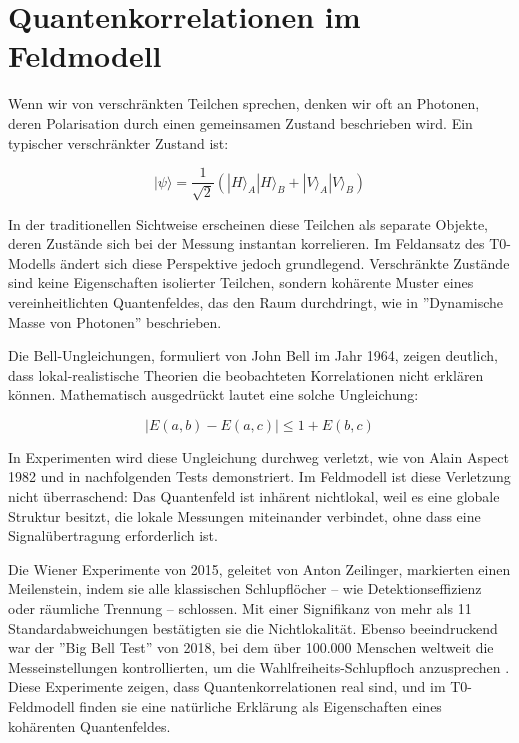\documentclass[a4paper,12pt]{article}
\theoremstyle{definition}
\theoremstyle{remark}
\begin{document}
	\section{Quantenkorrelationen im Feldmodell}
	
	Wenn wir von verschränkten Teilchen sprechen, denken wir oft an Photonen, deren Polarisation durch einen gemeinsamen Zustand beschrieben wird. Ein typischer verschränkter Zustand ist:
	
	\begin{equation}
		|\psi\rangle = \frac{1}{\sqrt{2}} (|H\rangle_A |H\rangle_B + |V\rangle_A |V\rangle_B)
	\end{equation}
	
	In der traditionellen Sichtweise erscheinen diese Teilchen als separate Objekte, deren Zustände sich bei der Messung instantan korrelieren. Im Feldansatz des T0-Modells ändert sich diese Perspektive jedoch grundlegend. Verschränkte Zustände sind keine Eigenschaften isolierter Teilchen, sondern kohärente Muster eines vereinheitlichten Quantenfeldes, das den Raum durchdringt, wie in ''Dynamische Masse von Photonen'' \cite{pascher_photons_2025} beschrieben.
	
	Die Bell-Ungleichungen, formuliert von John Bell im Jahr 1964, zeigen deutlich, dass lokal-realistische Theorien die beobachteten Korrelationen nicht erklären können. Mathematisch ausgedrückt lautet eine solche Ungleichung:
	
	\begin{equation}
		|E(a,b) - E(a,c)| \leq 1 + E(b,c)
	\end{equation}
	
	In Experimenten wird diese Ungleichung durchweg verletzt, wie von Alain Aspect 1982 und in nachfolgenden Tests \cite{Aspect1982} demonstriert. Im Feldmodell ist diese Verletzung nicht überraschend: Das Quantenfeld ist inhärent nichtlokal, weil es eine globale Struktur besitzt, die lokale Messungen miteinander verbindet, ohne dass eine Signalübertragung erforderlich ist.
	
	Die Wiener Experimente von 2015, geleitet von Anton Zeilinger, markierten einen Meilenstein, indem sie alle klassischen Schlupflöcher – wie Detektionseffizienz oder räumliche Trennung \cite{Giustina2015} – schlossen. Mit einer Signifikanz von mehr als 11 Standardabweichungen bestätigten sie die Nichtlokalität. Ebenso beeindruckend war der ''Big Bell Test'' von 2018, bei dem über 100.000 Menschen weltweit die Messeinstellungen kontrollierten, um die Wahlfreiheits-Schlupfloch anzusprechen \cite{BigBellTest2018}. Diese Experimente zeigen, dass Quantenkorrelationen real sind, und im T0-Feldmodell finden sie eine natürliche Erklärung als Eigenschaften eines kohärenten Quantenfeldes.
	
\end{document}
